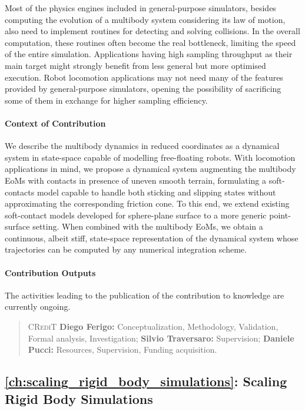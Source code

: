 Most of the physics engines included in general-purpose simulators, besides computing the evolution of a multibody system considering its law of motion, also need to implement routines for detecting and solving collisions.
In the overall computation, these routines often become the real bottleneck, limiting the speed of the entire simulation.
Applications having high sampling throughput as their main target might strongly benefit from less general but more optimised execution.
Robot locomotion applications may not need many of the features provided by general-purpose simulators, opening the possibility of sacrificing some of them in exchange for higher sampling efficiency.

\paragraph{Context of Contribution}

We describe the multibody dynamics in reduced coordinates as a dynamical system in state-space capable of modelling free-floating robots.
With locomotion applications in mind, we propose a dynamical system augmenting the multibody \acp{EoM} with contacts in presence of uneven smooth terrain, formulating a soft-contacts model capable to handle both sticking and slipping states without approximating the corresponding friction cone.
To this end, we extend existing soft-contact models developed for sphere-plane surface to a more generic point-surface setting.
When combined with the multibody \acp{EoM}, we obtain a continuous, albeit stiff, state-space representation of the dynamical system whose trajectories can be computed by any numerical integration scheme.

\paragraph{Contribution Outputs}

The activities leading to the publication of the contribution to knowledge are currently ongoing.
%
\begin{quote}
    \textsc{CRediT} \hspace{2mm}
    \textbf{Diego Ferigo:} Conceptualization, Methodology, Validation, Formal analysis, Investigation;
    \textbf{Silvio Traversaro:} Supervision;
    \textbf{Daniele Pucci:} Resources, Supervision, Funding acquisition.
\end{quote}

\pagebreak
\subsection{\autoref{ch:scaling_rigid_body_simulations}: Scaling Rigid Body Simulations}

